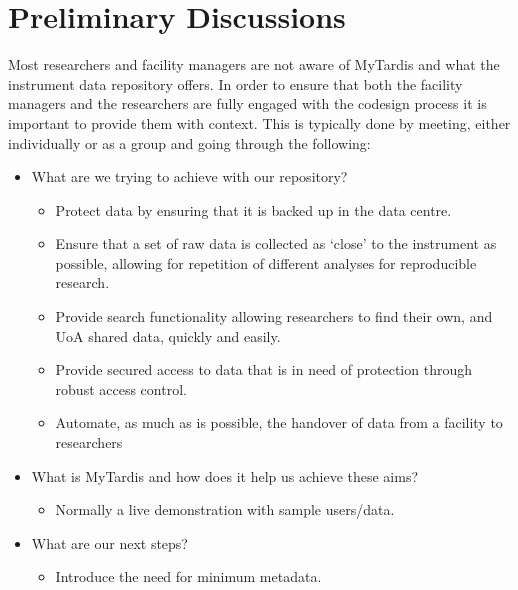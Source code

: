 \documentclass[letterpaper,10pt,english]{sphinxmanual}
\begin{document}
\section{Preliminary Discussions}
\label{\detokenize{index:preliminary-discussions}}\label{\detokenize{index:prelim}}
\sphinxAtStartPar
Most researchers and facility managers are not aware of MyTardis and what the instrument data repository offers. In order to ensure that both the facility managers and the researchers are fully engaged with the co\sphinxhyphen{}design process it is important to provide them with context. This is typically done by meeting, either individually or as a group and going through the following:
\begin{itemize}
\item {}
\sphinxAtStartPar
What are we trying to achieve with our repository?
\begin{itemize}
\item {}
\sphinxAtStartPar
Protect data by ensuring that it is backed up in the data centre.

\item {}
\sphinxAtStartPar
Ensure that a set of raw data is collected as ‘close’ to the instrument as possible, allowing for repetition of different analyses for reproducible research.

\item {}
\sphinxAtStartPar
Provide search functionality allowing researchers to find their own, and UoA shared data, quickly and easily.

\item {}
\sphinxAtStartPar
Provide secured access to data that is in need of protection through robust access control.

\item {}
\sphinxAtStartPar
Automate, as much as is possible, the hand\sphinxhyphen{}over of data from a facility to researchers

\end{itemize}

\item {}
\sphinxAtStartPar
What is MyTardis and how does it help us achieve these aims?
\begin{itemize}
\item {}
\sphinxAtStartPar
Normally a live demonstration with sample users/data.

\end{itemize}

\item {}
\sphinxAtStartPar
What are our next steps?
\begin{itemize}
\item {}
\sphinxAtStartPar
Introduce the need for minimum metadata.


\end{itemize}
\end{itemize}
\end{document}
